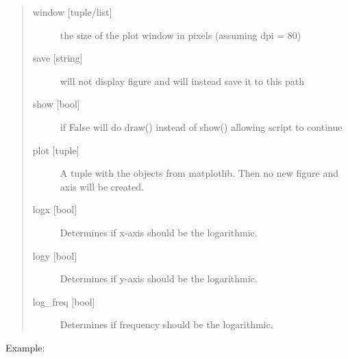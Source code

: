 \documentclass[letterpaper,10pt,english]{sphinxmanual}
\begin{document}
\begin{fulllineitems}
\begin{description}
\begin{quote}
\begin{description}
\item[{window {[}tuple/list{]}}] \leavevmode
the size of the plot window in pixels (assuming dpi = 80)

\item[{save {[}string{]}}] \leavevmode
will not display figure and will instead save it to this path

\item[{show {[}bool{]}}] \leavevmode
if False will do draw() instead of show() allowing script to continue

\item[{plot {[}tuple{]}}] \leavevmode
A tuple with the  objects from matplotlib. Then no new figure and axis will be created.

\item[{logx {[}bool{]}}] \leavevmode
Determines if x-axis should be the logarithmic.

\item[{logy {[}bool{]}}] \leavevmode
Determines if y-axis should be the logarithmic.

\item[{log\_freq {[}bool{]}}] \leavevmode
Determines if frequency should be the logarithmic.

\end{description}\end{quote}

\end{description}

Example:

%
\begin{sphinxVerbatim}[commandchars=\\\{\}]
   
   

  

     
\end{sphinxVerbatim}

\end{fulllineitems}
\end{document}
